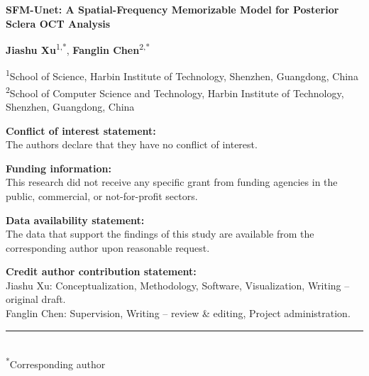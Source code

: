 \documentclass[]{article} %
\begin{document}
\begin{titlepage}
    \begin{center}
        \noindent\fontsize{12}{15}\selectfont\textbf{SFM-Unet: A Spatial-Frequency Memorizable Model for Posterior Sclera OCT Analysis}
        
        \vspace{8mm}
        \noindent\small
        \textbf{Jiashu Xu}\textsuperscript{1,*}, \textbf{Fanglin Chen}\textsuperscript{2,*}
        
        \vspace{4mm}
        \noindent\textsuperscript{1}School of Science, Harbin Institute of Technology, Shenzhen, Guangdong, China\\
        \noindent\textsuperscript{2}School of Computer Science and Technology, Harbin Institute of Technology, Shenzhen, Guangdong, China

        \vspace{8mm}
        \noindent\textbf{Conflict of interest statement:}\\
        The authors declare that they have no conflict of interest.

        \vspace{6mm}
        \noindent\textbf{Funding information:}\\
        This research did not receive any specific grant from funding agencies in the public, commercial, or not-for-profit sectors.

        \vspace{6mm}
        \noindent\textbf{Data availability statement:}\\
        The data that support the findings of this study are available from the corresponding author upon reasonable request.

        \vspace{6mm}
        \noindent\textbf{Credit author contribution statement:}\\
        Jiashu Xu: Conceptualization, Methodology, Software, Visualization, Writing – original draft.\\
        Fanglin Chen: Supervision, Writing – review \& editing, Project administration.

        \vspace{8mm}
        \noindent\rule{0.6\textwidth}{0.4pt}\\
        \textsuperscript{*}Corresponding author
    \end{center}
\end{titlepage}
\end{document}
